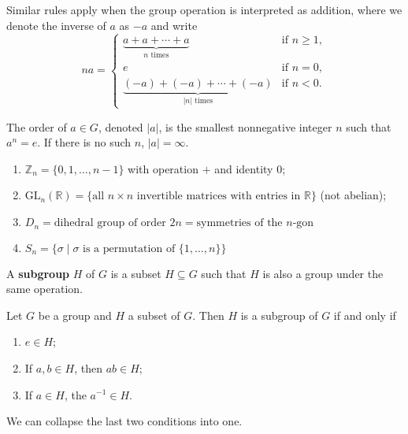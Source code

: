 Similar rules apply when the group operation is interpreted as addition, where we denote the inverse of $a$ as $-a$ and write
$$na=\begin{cases}
	\underbrace{a+a+\cdots+a}_{n\text{ times}} & \text{if $n\geq 1$},\\
	e & \text{if $n=0$},\\
	\underbrace{(-a)+(-a)+\cdots+(-a)}_{|n|\text{ times}} & \text{if $n<0$}.
\end{cases}$$

\begin{definition}
	The order of $a\in G$, denoted $|a|$, is the smallest nonnegative integer $n$ such that $a^n=e$. If there is no such $n$, $|a|=\infty$.
\end{definition}

\begin{example}\phantom{x}
\begin{enumerate}
	\item $\mathbb Z_n=\{0,1,\hdots,n-1\}$ with operation $+$ and identity $0$;
	\item $\text{GL}_n(\mathbb R)=\{\text{all $n\times n$ invertible matrices with entries in $\mathbb R$}\}$ (not abelian);
	\item $D_n=\text{dihedral group of order $2n$}=\text{symmetries of the $n$-gon}$
	\item $S_n=\{\sigma\mid\text{$\sigma$ is a permutation of $\{1,\hdots,n\}$}\}$
\end{enumerate}
\end{example}

\begin{definition}[subgroup]
	A \textbf{subgroup} $H$ of $G$ is a subset $H\subseteq G$ such that $H$ is also a group under the same operation.
\end{definition}

\begin{proposition}\label{prop:subgroup_criterion}
	Let $G$ be a group and $H$ a subset of $G$. Then $H$ is a subgroup of $G$ if and only if
	\begin{enumerate}
		\item $e\in H$;
		\item If $a,b\in H$, then $ab\in H$;
		\item If $a\in H$, the $a^{-1}\in H$.
	\end{enumerate}
\end{proposition}

We can collapse the last two conditions into one.

